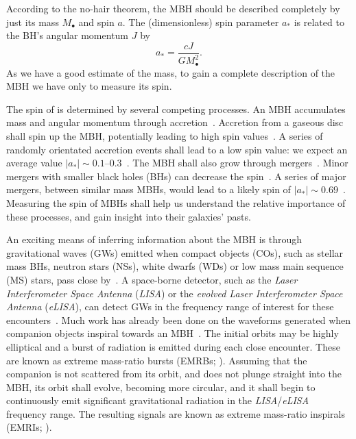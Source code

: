 \documentclass[11pt,twoside]{article}
\begin{document}
According to the no-hair theorem, the MBH should be described completely by just its mass $M_\bullet$ and spin $a$\citep{Israel1967, Israel1968, Carter1971, Hawking1972, Robinson1975, Chandrasekhar1998}. The (dimensionless) spin parameter $a_\ast$ is related to the BH's angular momentum $J$ by
\begin{equation}
a_\ast = \frac{cJ}{GM_\bullet^2}.
\end{equation}
As we have a good estimate of the mass, to gain a complete description of the MBH we have only to measure its spin.

The spin of is determined by several competing processes. An MBH accumulates mass and angular momentum through accretion~\citep{Volonteri2010}. Accretion from a gaseous disc shall spin up the MBH, potentially leading to high spin values~\citep{Volonteri2005}. A series of randomly orientated accretion events shall lead to a low spin value: we expect an average value $|a_\ast| \sim 0.1$--$0.3$~\citep*{King2006, King2008}. The MBH shall also grow through mergers~\citep{Yu2002, Malbon2007}. Minor mergers with smaller black holes (BHs) can decrease the spin~\citep*{Hughes2003, Gammie2004}. A series of major mergers, between similar mass MBHs, would lead to a likely spin of $|a_\ast| \sim 0.69$~\citep{Berti2008, Berti2007, Gonzalez2007}. Measuring the spin of MBHs shall help us understand the relative importance of these processes, and gain insight into their galaxies' pasts.

An exciting means of inferring information about the MBH is through gravitational waves (GWs) emitted when compact objects (COs), such as stellar mass BHs, neutron stars (NSs), white dwarfs (WDs) or low mass main sequence (MS) stars, pass close by~\citep{Sathyaprakash2009}. A space-borne detector, such as the \textit{Laser Interferometer Space Antenna} (\textit{LISA}) or the \textit{evolved Laser Interferometer Space Antenna} (\textit{eLISA}), can detect GWs in the frequency range of interest for these encounters~\citep{Bender1998, Danzmann2003, Jennrich2011, Amaro-Seoane2012a}. Much work has already been done on the waveforms generated when companion objects inspiral towards an MBH~\citep{Glampedakis2005, Barack2009}. The initial orbits may be highly elliptical and a burst of radiation is emitted during each close encounter. These are known as extreme mass-ratio bursts (EMRBs; \citealt{Rubbo2006}). Assuming that the companion is not scattered from its orbit, and does not plunge straight into the MBH, its orbit shall evolve, becoming more circular, and it shall begin to continuously emit significant gravitational radiation in the \textit{LISA}/\textit{eLISA} frequency range. The resulting signals are known as extreme mass-ratio inspirals (EMRIs; \citealt{Amaro-Seoane2007}).
\end{document}
